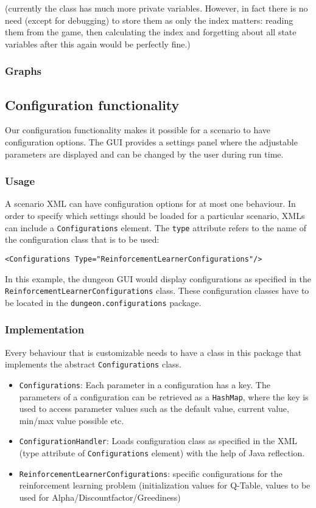 \documentclass[a4paper,10pt]{scrartcl}
\begin{document}
(currently the class has much more private variables. However, in fact there is no need (except for debugging) to store them as only the index matters: reading them from the game, then calculating the index and forgetting about all state variables after this again would be perfectly fine.)


\subsubsection{Graphs}

\subsection{Configuration functionality}
Our configuration functionality makes it possible for a scenario to have configuration options. The GUI provides a settings panel where the adjustable parameters are displayed and can be changed by the user during run time.

\subsubsection{Usage}
A scenario XML can have configuration options for at most one behaviour. In order to specify which settings should be loaded for a particular scenario, XMLs can include a \verb|Configurations| element. The \verb|type| attribute refers to the name of the configuration class that is to be used:
\begin{verbatim}
<Configurations Type="ReinforcementLearnerConfigurations"/>
\end{verbatim}
In this example, the dungeon GUI would display configurations as specified in the  \verb|ReinforcementLearnerConfigurations| class. These configuration classes have to be located in the \verb|dungeon.configurations| package.


\subsubsection{Implementation}
Every behaviour that is customizable needs to have a class in this package that implements the abstract \verb|Configurations| class.
\begin{itemize}
\item \verb|Configurations|: Each parameter in a configuration has a key. The parameters of a configuration can be retrieved as a \verb|HashMap|, where the key is used to access parameter values such as the default value, current value, min/max value possible etc. 
\item \verb|ConfigurationHandler|: Loads configuration class as specified in the XML (type attribute of \verb|Configurations| element) with the help of Java reflection.
\item \verb|ReinforcementLearnerConfigurations|: specific configurations for the reinforcement learning problem (initialization values for Q-Table, values to be used for Alpha/Discountfactor/Greediness)
\end{itemize}
\end{document}
